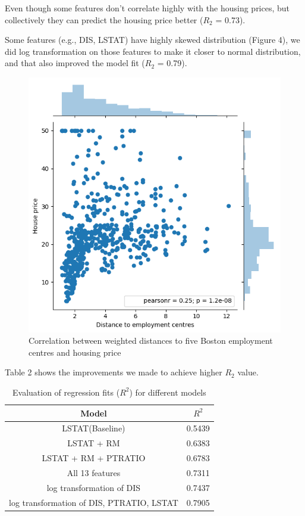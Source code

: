 \documentclass[11pt]{article}
\begin{document}
Even though some features don't correlate highly with the housing prices, but collectively they can predict the housing price better ($R_{2}$ = 0.73). 

Some features (e.g., DIS, LSTAT) have highly skewed distribution (Figure 4), we did log transformation on those features to make it closer to normal distribution, and that also improved the model fit ($R_{2}$ = 0.79).\\

\begin{figure}[!htbp]
 \centering
 \includegraphics[scale = 0.5]{distance}
 \captionsetup{font=scriptsize}
  \caption[8pt]{Correlation between weighted distances to five Boston employment centres and housing price}
\end{figure}

Table 2 shows the improvements we made to achieve higher $R_{2}$ value.

\begin{table}[!htbp]
\small
\centering
\captionsetup{font=scriptsize}
\caption[8pt]{Evaluation of regression fits ($R^{2}$) for different models}
\begin{tabular}{|c|c|}
 \hline
Model & $R^{2}$ \\
  \hline
LSTAT(Baseline)  & 0.5439\\
LSTAT + RM      & 0.6383 \\
LSTAT + RM + PTRATIO    & 0.6783 \\
All 13 features & 0.7311 \\
log transformation of DIS     & 0.7437 \\
log transformation of DIS, PTRATIO, LSTAT   & 0.7905\\
\hline
\end{tabular}
\end{table}
\end{document}
